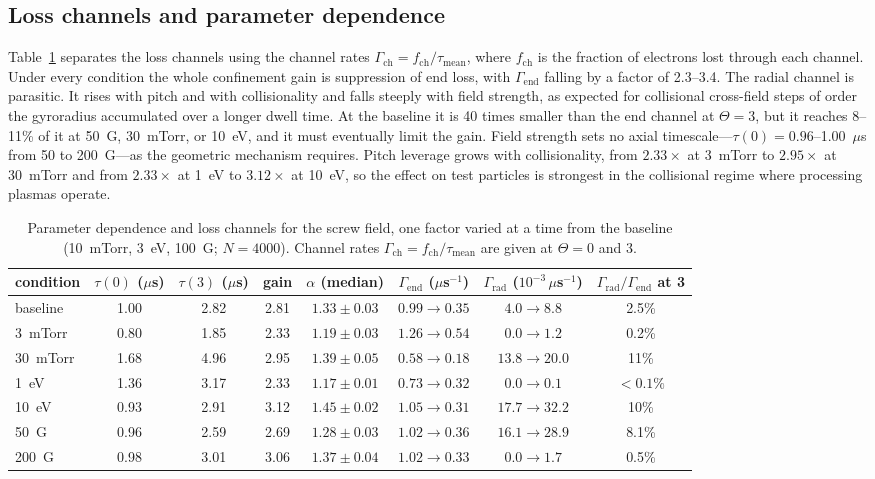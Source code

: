 \documentclass[11pt]{article}
\newcommand{\us}{\ensuremath{\mu}s}
\begin{document}
\subsection{Loss channels and parameter dependence}
\label{sec:topology}

Table~\ref{tab:params} separates the loss channels using the channel rates $\Gamma_{\mathrm{ch}} = f_{\mathrm{ch}}/\tau_{\mathrm{mean}}$, where $f_{\mathrm{ch}}$ is the fraction of electrons lost through each channel. Under every condition the whole confinement gain is suppression of end loss, with $\Gamma_{\mathrm{end}}$ falling by a factor of 2.3--3.4. The radial channel is parasitic. It rises with pitch and with collisionality and falls steeply with field strength, as expected for collisional cross-field steps of order the gyroradius accumulated over a longer dwell time. At the baseline it is 40 times smaller than the end channel at $\Theta = 3$, but it reaches 8--11\% of it at 50~G, 30~mTorr, or 10~eV, and it must eventually limit the gain. Field strength sets no axial timescale---$\tau(0) = 0.96$--1.00~\us{} from 50 to 200~G---as the geometric mechanism requires. Pitch leverage grows with collisionality, from $2.33\times$ at 3~mTorr to $2.95\times$ at 30~mTorr and from $2.33\times$ at 1~eV to $3.12\times$ at 10~eV, so the effect on test particles is strongest in the collisional regime where processing plasmas operate.

\begin{table}[htbp]
\centering
\small
\setlength{\tabcolsep}{4.5pt}
\caption{Parameter dependence and loss channels for the screw field, one factor varied at a time from the baseline (10~mTorr, 3~eV, 100~G; $N = 4000$). Channel rates $\Gamma_{\mathrm{ch}} = f_{\mathrm{ch}}/\tau_{\mathrm{mean}}$ are given at $\Theta = 0$ and 3.}
\label{tab:params}
\begin{tabular}{lccccccc}
\toprule
condition & $\tau(0)$ (\us) & $\tau(3)$ (\us) & gain & $\alpha$ (median) & $\Gamma_{\mathrm{end}}$ (\us$^{-1}$) & $\Gamma_{\mathrm{rad}}$ ($10^{-3}$\,\us$^{-1}$) & $\Gamma_{\mathrm{rad}}/\Gamma_{\mathrm{end}}$ at 3 \\
\midrule
baseline & 1.00 & 2.82 & 2.81 & $1.33 \pm 0.03$ & $0.99 \to 0.35$ & $4.0 \to 8.8$ & 2.5\% \\
3~mTorr  & 0.80 & 1.85 & 2.33 & $1.19 \pm 0.03$ & $1.26 \to 0.54$ & $0.0 \to 1.2$ & 0.2\% \\
30~mTorr & 1.68 & 4.96 & 2.95 & $1.39 \pm 0.05$ & $0.58 \to 0.18$ & $13.8 \to 20.0$ & 11\% \\
1~eV     & 1.36 & 3.17 & 2.33 & $1.17 \pm 0.01$ & $0.73 \to 0.32$ & $0.0 \to 0.1$ & $<0.1\%$ \\
10~eV    & 0.93 & 2.91 & 3.12 & $1.45 \pm 0.02$ & $1.05 \to 0.31$ & $17.7 \to 32.2$ & 10\% \\
50~G     & 0.96 & 2.59 & 2.69 & $1.28 \pm 0.03$ & $1.02 \to 0.36$ & $16.1 \to 28.9$ & 8.1\% \\
200~G    & 0.98 & 3.01 & 3.06 & $1.37 \pm 0.04$ & $1.02 \to 0.33$ & $0.0 \to 1.7$ & 0.5\% \\
\bottomrule
\end{tabular}
\end{table}
\end{document}
